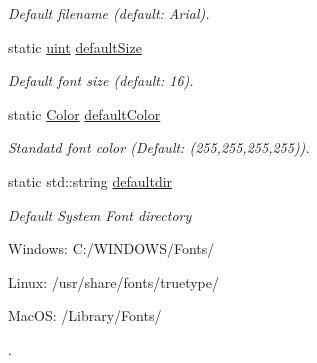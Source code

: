 \begin{DoxyCompactItemize}
\begin{DoxyCompactList}\small\item\em Default filename (default: Arial). \item\end{DoxyCompactList}\item 
\hypertarget{class_f2_c_1_1_t_t_f_font_a5431854a6264e3b1fcb7f99cde02f1a8}{
static \hyperlink{namespace_f2_c_a58be2bac9eb3e3c99cb41b6008bf4fae}{uint} \hyperlink{class_f2_c_1_1_t_t_f_font_a5431854a6264e3b1fcb7f99cde02f1a8}{defaultSize}}
\label{class_f2_c_1_1_t_t_f_font_a5431854a6264e3b1fcb7f99cde02f1a8}

\begin{DoxyCompactList}\small\item\em Default font size (default: 16). \item\end{DoxyCompactList}\item 
\hypertarget{class_f2_c_1_1_t_t_f_font_ab7f6ea26f4fb213a32ab1a2df7b201e8}{
static \hyperlink{class_f2_c_1_1_color}{Color} \hyperlink{class_f2_c_1_1_t_t_f_font_ab7f6ea26f4fb213a32ab1a2df7b201e8}{defaultColor}}
\label{class_f2_c_1_1_t_t_f_font_ab7f6ea26f4fb213a32ab1a2df7b201e8}

\begin{DoxyCompactList}\small\item\em Standatd font color (Default: (255,255,255,255)). \item\end{DoxyCompactList}\item 
\hypertarget{class_f2_c_1_1_t_t_f_font_ace31b30c45ce0b257b1c593cf4cbbed4}{
static std::string \hyperlink{class_f2_c_1_1_t_t_f_font_ace31b30c45ce0b257b1c593cf4cbbed4}{defaultdir}}
\label{class_f2_c_1_1_t_t_f_font_ace31b30c45ce0b257b1c593cf4cbbed4}

\begin{DoxyCompactList}\small\item\em Default System Font directory \par
 Windows: C:/WINDOWS/Fonts/ \par
 Linux: /usr/share/fonts/truetype/ \par
 MacOS: /Library/Fonts/ \par
. \item\end{DoxyCompactList}\end{DoxyCompactItemize}
